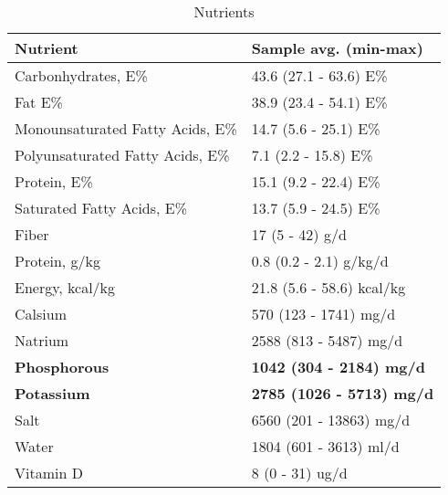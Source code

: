 \documentclass[border=1mm, preview]{standalone}
\begin{document}
\begin{table}

\caption{\label{tab:table1}Nutrients}
\centering
\begin{tabu} to 
\toprule
\textbf{Nutrient} & \textbf{Sample avg. (min-max)}\\
\midrule
Carbonhydrates, E\% & 43.6 (27.1 - 63.6) E\%\\
Fat E\% & 38.9 (23.4 - 54.1) E\%\\
Monounsaturated Fatty Acids, E\% & 14.7 (5.6 - 25.1) E\%\\
Polyunsaturated Fatty Acids, E\% & 7.1 (2.2 - 15.8) E\%\\
Protein, E\% & 15.1 (9.2 - 22.4) E\%\\
\addlinespace
Saturated Fatty Acids, E\% & 13.7 (5.9 - 24.5) E\%\\
Fiber & 17 (5 - 42) g/d\\
Protein, g/kg & 0.8 (0.2 - 2.1) g/kg/d\\
Energy, kcal/kg & 21.8 (5.6 - 58.6) kcal/kg\\
Calsium & 570 (123 - 1741) mg/d\\
\addlinespace
Natrium & 2588 (813 - 5487) mg/d\\
\textbf{Phosphorous} & \textbf{1042 (304 - 2184) mg/d}\\
\textbf{Potassium} & \textbf{2785 (1026 - 5713) mg/d}\\
Salt & 6560 (201 - 13863) mg/d\\
Water & 1804 (601 - 3613) ml/d\\
\addlinespace
Vitamin D & 8 (0 - 31) ug/d\\
\bottomrule
\end{tabu}
\end{table}
\end{document}
